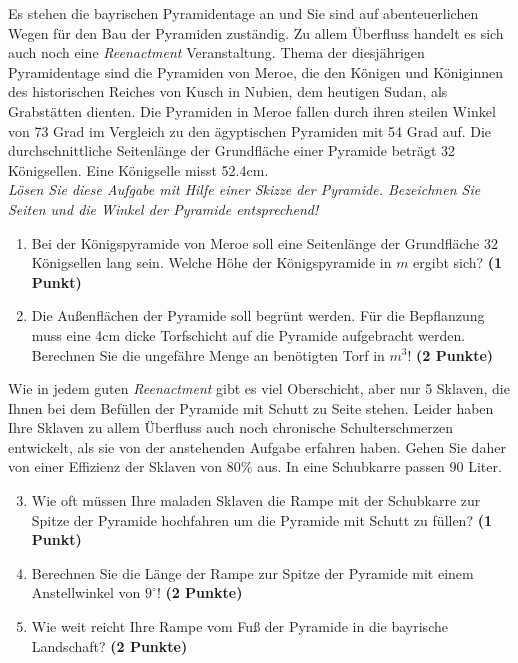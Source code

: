 \documentclass[a4paper, 9pt]{scrartcl}\usepackage[]{graphicx}\usepackage[]{xcolor}
\begin{document}
Es stehen die bayrischen Pyramidentage an und Sie sind auf
abenteuerlichen Wegen f{\"u}r den Bau der Pyramiden zust{\"a}ndig. Zu allem
{\"U}berfluss handelt es sich auch noch eine \textit{Reenactment}
Veranstaltung. Thema der diesj{\"a}hrigen Pyramidentage sind die Pyramiden von
Meroe, die den K{\"o}nigen und K{\"o}niginnen des historischen Reiches von Kusch in
Nubien, dem heutigen Sudan, als Grabst{\"a}tten dienten. Die Pyramiden in Meroe
fallen durch ihren steilen Winkel von 73 Grad im Vergleich zu
den {\"a}gyptischen Pyramiden mit 54 Grad auf. Die durchschnittliche
Seitenl{\"a}nge der Grundfl{\"a}che einer Pyramide betr{\"a}gt 32 K{\"o}nigsellen. Eine K{\"o}nigselle
misst 52.4cm.\\

\textit{L{\"o}sen Sie diese Aufgabe mit Hilfe einer Skizze der Pyramide. Bezeichnen
  Sie Seiten und die Winkel der Pyramide entsprechend!}

\begin{enumerate}
\item Bei der K{\"o}nigspyramide von Meroe soll eine Seitenl{\"a}nge der Grundfl{\"a}che
  32 K{\"o}nigsellen lang sein. Welche H{\"o}he der K{\"o}nigspyramide in $m$
  ergibt sich? \textbf{(1 Punkt)}
\item Die Au{\ss}enfl{\"a}chen der Pyramide soll begr{\"u}nt werden. F{\"u}r die
  Bepflanzung muss eine 4cm dicke Torfschicht auf die
  Pyramide aufgebracht werden. Berechnen Sie die ungef{\"a}hre Menge an
  ben{\"o}tigten Torf in $m^3$! \textbf{(2 Punkte)}
\end{enumerate}

Wie in jedem guten \textit{Reenactment} gibt es viel Oberschicht, aber nur
5 Sklaven, die Ihnen bei dem Bef{\"u}llen der Pyramide mit Schutt
zu Seite stehen. Leider haben Ihre Sklaven zu allem {\"U}berfluss auch noch
chronische Schulterschmerzen entwickelt, als sie von der
anstehenden Aufgabe erfahren haben. Gehen Sie daher von einer Effizienz der
Sklaven von 80\% aus. In eine Schubkarre passen
90 Liter.

\begin{enumerate}
  \setcounter{enumi}{2}
\item Wie oft m{\"u}ssen Ihre maladen Sklaven die Rampe mit der Schubkarre
  zur Spitze der Pyramide hochfahren um die Pyramide mit Schutt zu f{\"u}llen? \textbf{(1 Punkt)}
\item Berechnen Sie die L{\"a}nge der Rampe zur Spitze der Pyramide mit einem
  Anstellwinkel von $9^\circ$! \textbf{(2 Punkte)}
\item Wie weit reicht Ihre Rampe vom Fu{\ss} der Pyramide in die bayrische
  Landschaft?  \textbf{(2 Punkte)}
\end{enumerate}
\end{document}
